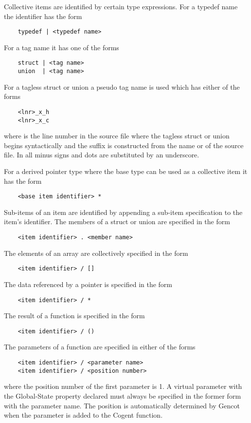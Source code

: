 Collective items are identified by certain type expressions. For a typedef name the identifier has the form
\begin{verbatim}
    typedef | <typedef name>
\end{verbatim}
For a tag name it has one of the forms
\begin{verbatim}
    struct | <tag name>
    union  | <tag name>
\end{verbatim}
For a tagless struct or union a pseudo tag name is used which has either of the forms
\begin{verbatim}
    <lnr>_x_h
    <lnr>_x_c
\end{verbatim}
where  is the line number in the source file where the tagless struct or union begins syntactically 
and the suffix is constructed from the name  or  of the source file. In  all minus signs
and dots are substituted by an underscore.

For a derived pointer type where the base type can be used as a collective item it has the form
\begin{verbatim}
    <base item identifier> *
\end{verbatim}

Sub-items of an item are identified by appending a sub-item specification to the item's identifier.
The members of a struct or union are specified in the form
\begin{verbatim}
    <item identifier> . <member name>
\end{verbatim}
The elements of an array are collectively specified in the form
\begin{verbatim}
    <item identifier> / []
\end{verbatim}
The data referenced by a pointer is specified in the form
\begin{verbatim}
    <item identifier> / *
\end{verbatim}
The result of a function is specified in the form
\begin{verbatim}
    <item identifier> / ()
\end{verbatim}
The parameters of a function are specified in either of the forms
\begin{verbatim}
    <item identifier> / <parameter name>
    <item identifier> / <position number>
\end{verbatim}
where the position number of the first parameter is 1. A virtual parameter with the Global-State property
declared must always be specified in the former form with the parameter name. The position is automatically
determined by Gencot when the parameter is added to the Cogent function.

